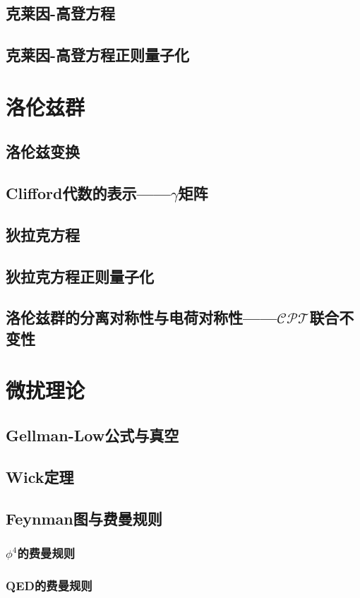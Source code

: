 \documentclass[a4paper,11pt]{article}
\begin{document}
\subsection{克莱因-高登方程}
\subsection{克莱因-高登方程正则量子化}
\section{洛伦兹群}
\subsection{洛伦兹变换}
\subsection{Clifford代数的表示——$\gamma$矩阵}
\subsection{狄拉克方程}
\subsection{狄拉克方程正则量子化}
\subsection{洛伦兹群的分离对称性与电荷对称性——$\mathcal{CPT}$联合不变性}
\section{微扰理论}
\subsection{Gellman-Low公式与真空}
\subsection{Wick定理}
\subsection{Feynman图与费曼规则}
\subsubsection{$\phi^4$的费曼规则}
\subsubsection{QED的费曼规则}
\end{document}
